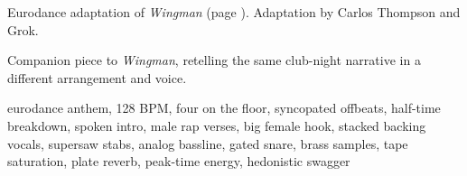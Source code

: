 
\label{sec:soundwall}
\begin{notes}
Eurodance adaptation of \emph{Wingman} (page \pageref{sec:wingman}). Adaptation by Carlos Thompson and Grok.

Companion piece to \emph{Wingman}, retelling the same club-night narrative in a different arrangement and voice.
\end{notes}
\begin{style}
eurodance anthem, 128 BPM, four on the floor, syncopated offbeats, half-time breakdown, spoken intro, male rap verses, big female hook, stacked backing vocals, supersaw stabs, analog bassline, gated snare, brass samples, tape saturation, plate reverb, peak-time energy, hedonistic swagger
\end{style}
